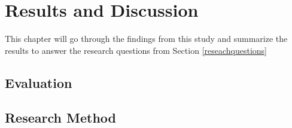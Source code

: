 \chapter{Results and Discussion}
\label{resultsanddiscussion}

This chapter will go through the findings from this study and summarize the results to answer the research questions from Section \ref{reseachquestions}


\section{Evaluation}


\section{Research Method}


